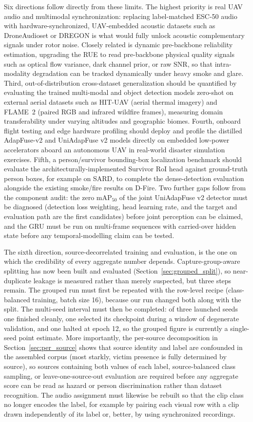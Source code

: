 Six directions follow directly from these limits. The highest priority is real UAV audio and multimodal synchronization: replacing label-matched ESC-50 audio with hardware-synchronized, UAV-embedded acoustic datasets such as DroneAudioset or DREGON is what would fully unlock acoustic complementary signals under rotor noise. Closely related is dynamic pre-backbone reliability estimation, upgrading the RUE to read pre-backbone physical quality signals such as optical flow variance, dark channel prior, or raw SNR, so that intra-modality degradation can be tracked dynamically under heavy smoke and glare. Third, out-of-distribution cross-dataset generalization should be quantified by evaluating the trained multi-modal and object detection models zero-shot on external aerial datasets such as HIT-UAV (aerial thermal imagery) and FLAME~2 (paired RGB and infrared wildfire frames), measuring domain transferability under varying altitudes and geographic biomes. Fourth, onboard flight testing and edge hardware profiling should deploy and profile the distilled AdapFuse-v2 and UniAdapFuse v2 models directly on embedded low-power accelerators aboard an autonomous UAV in real-world disaster simulation exercises. Fifth, a person/survivor bounding-box localization benchmark should evaluate the architecturally-implemented Survivor RoI head against ground-truth person boxes, for example on SARD, to complete the dense-detection evaluation alongside the existing smoke/fire results on D-Fire. Two further gaps follow from the component audit: the zero $\mathrm{mAP}_{50}$ of the joint UniAdapFuse v2 detector must be diagnosed (detection loss weighting, head learning rate, and the target and evaluation path are the first candidates) before joint perception can be claimed, and the GRU must be run on multi-frame sequences with carried-over hidden state before any temporal-modelling claim can be tested.

The sixth direction, source-decorrelated training and evaluation, is the one on which the credibility of every aggregate number depends. Capture-group-aware splitting has now been built and evaluated (Section~\ref{sec:grouped_split}), so near-duplicate leakage is measured rather than merely suspected, but three steps remain. The grouped run must first be repeated with the row-level recipe (class-balanced training, batch size 16), because our run changed both along with the split. The multi-seed interval must then be completed: of three launched seeds one finished cleanly, one selected its checkpoint during a window of degenerate validation, and one halted at epoch 12, so the grouped figure is currently a single-seed point estimate. More importantly, the per-source decomposition in Section~\ref{sec:per_source} shows that source identity and label are confounded in the assembled corpus (most starkly, victim presence is fully determined by source), so sources containing both values of each label, source-balanced class sampling, or leave-one-source-out evaluation are required before any aggregate score can be read as hazard or person discrimination rather than dataset recognition. The audio assignment must likewise be rebuilt so that the clip class no longer encodes the label, for example by pairing each visual row with a clip drawn independently of its label or, better, by using synchronized recordings.
